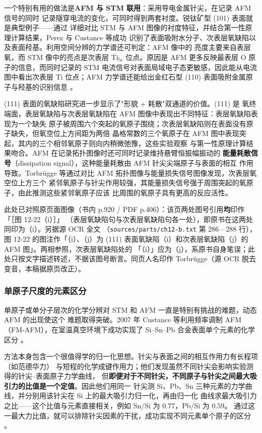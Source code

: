 一个特别有用的做法是\textbf{AFM 与 STM 联用}：采用导电金属针尖，在记录 AFM 信号的同时
记录隧穿电流的变化，可同时得到两套衬度。锐钛矿型 (101) 表面就是典型例子——通过
详细对比 STM 与 AFM 图像的衬度特征，并结合第一性原理计算结果，Perez 与 Custance 等成功
识别了表面吸附水分子、次表层氧缺陷以及表面羟基。利用空间分辨的力学谱还可判定：AFM 像中的
亮度主要来自表层氧，而 STM 像中的亮点是次表层 Ti$_{5c}$ 位点。原因是 AFM 更多反映最表层
O 原子的信息，而同时记录的 STM 电流信号对表面局域电子态更敏感，因此能从电流图中看出次表层
Ti 位点；AFM 力学谱还能给出金红石型 (110) 表面吸附金属原子与羟基的识别信息
。

(111) 表面的氧缺陷研究进一步显示了"形貌 + 耗散"双通道的价值。(111) 是
氧终端面，表层氧缺陷与次表层氧缺陷在 AFM 图像中表现出不同特征：表层氧缺陷表现为一个缺失
原子被周围六个突起的氧原子围绕；次表层氧缺陷则在表面没有原子缺失，但氧空位上方间距为两倍
晶格常数的三个氧原子在 AFM 图中表现突起，其内的三个相邻氧原子则向内稍微弛豫，这些实验观察
与第一性原理计算结果吻合。AFM 在记录拓扑图像时还可同时记录维持悬臂恒振幅振动的
\textbf{能量耗散信号}（dissipation signal），这种能量耗散由 AFM 针尖尖端原子与表面的相互
作用导致。Torbrügge 等通过对比 AFM 拓扑图像与能量损失信号图像发现，次表层氧空位上方三个
紧邻氧原子与针尖作用较强，其能量损失信号强于周围突起的氧原子，由此推测这些紧邻氧原子应该
比周围的氧原子具有更高的反应活性。

此处已对照原页面图像（书内 p.920 / PDF p.406）：该页两处图号引用\textbf{均}印作「［图 12-22（i）］」
（表层氧缺陷句与次表层氧缺陷句各一处），即原书在这两处同印为（i）。另据源 OCR 全文
（\texttt{sources/parts/ch12-b.txt} 第 286—288 行），图 12-22 的图注作「（i）、（j）为
(111) 表面氧缺陷（i）和次表层氧缺陷（j）的 AFM 图」。两相参照，次表层氧缺陷处的
「（i）」应为（j），系原书自身笔误；此处只按文字描述转述，不据该图号断言。同页人名印作
Torbrügge（源 OCR 脱去变音，本稿据原页改正）。

\subsubsection{单原子尺度的元素区分}

单原子或单分子层次的化学分辨对 STM 和 AFM 一直是特别有挑战的难题，动态 AFM 的出现使这个
难题取得突破。2007 年 Custance 等利用频率调制 AFM（FM-AFM），在室温真空环境下成功实现了
Si--Sn--Pb 合金表面单个元素的化学区分
。

方法本身包含一个很值得学的归一化思想。针尖与表面之间的相互作用力有长程项（如范德华力）
与短程的化学成键作用力；他们发现虽然不同针尖会影响实验测得的针尖--表面原子力学曲线，
但\textbf{即便对于不同针尖，不同原子与针尖之间最大吸引力的比值是一个定值}。因此他们用同一
针尖测 Si、Pb、Sn 三种元素的力学曲线，并分别用该针尖在 Si 上的最大吸引力归一化，再由归一化
曲线求最大吸引力之比——这个比值与元素直接相关，例如 Sn/Si 为 $0.77$，Pb/Si 为 $0.59$。
通过这一最大力比值，就可以排除针尖因素的干扰，成功实现不同元素单个原子的区分
。

